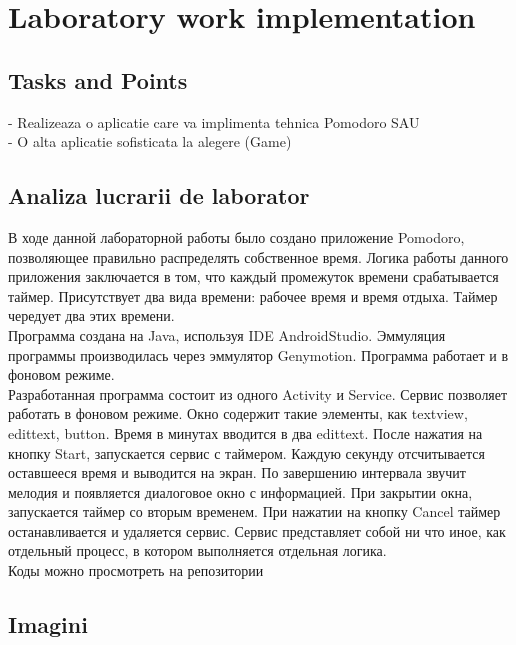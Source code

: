 \section{Laboratory work implementation}

\subsection{Tasks and Points}

- Realizeaza o aplicatie care va implimenta tehnica Pomodoro SAU\\
\indent 
- O alta aplicatie sofisticata la alegere (Game) 

\subsection{Analiza lucrarii de laborator}
В ходе данной лабораторной работы было создано приложение Pomodoro, позволяющее правильно распределять собственное время. Логика работы данного приложения заключается в том, что каждый промежуток времени срабатывается таймер. Присутствует два вида времени: рабочее время и время отдыха. Таймер чередует два этих времени.\\
\indent 
Программа создана на Java, используя IDE AndroidStudio. Эммуляция программы производилась через эммулятор Genymotion. Программа работает и в фоновом режиме.\\
\indent 
Разработанная программа состоит из одного Activity и Service. Сервис позволяет работать в фоновом режиме. Окно содержит такие элементы, как textview, edittext, button. Время в минутах вводится в два edittext. После нажатия на кнопку Start, запускается сервис с таймером. Каждую секунду отсчитывается оставшееся время и выводится на экран. По завершению интервала звучит мелодия и появляется диалоговое окно с информацией. При закрытии окна, запускается таймер со вторым временем. При нажатии на кнопку Cancel таймер останавливается и удаляется сервис. Сервис представляет собой ни что иное, как отдельный процесс, в котором выполняется отдельная логика. \\
\indent 
Коды можно просмотреть на репозитории 



\subsection{Imagini}

